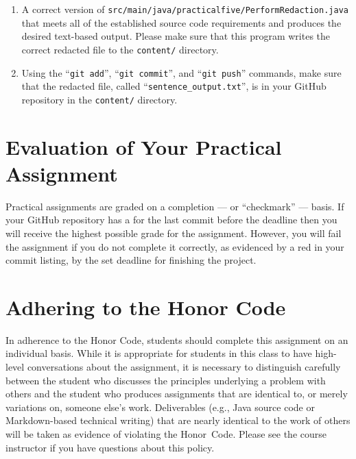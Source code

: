 \documentclass[11pt]{article}
\newcommand{\mainprogramsource}{\lstinline{src/main/java/practicalfive/PerformRedaction.java}}
\newcommand{\command}[1]{``\lstinline{#1}''}
\newcommand{\program}[1]{\lstinline{#1}}
\newcommand{\checkmark}{\ding{51}}
\newcommand{\naughtmark}{\ding{55}}
\begin{document}
\begin{enumerate}

\setlength{\itemsep}{0in}

\item A correct version of \mainprogramsource{} that meets all of the
  established source code requirements and produces the desired text-based
  output. Please make sure that this program writes the correct redacted file to
  the \program{content/} directory.

\item Using the \command{git add}, \command{git commit}, and \command{git push}
  commands, make sure that the redacted file, called
  \command{sentence_output.txt}, is in your GitHub repository in the
  \program{content/} directory.

\end{enumerate}

\section*{Evaluation of Your Practical Assignment}

Practical assignments are graded on a completion --- or ``checkmark'' --- basis.
If your GitHub repository has a \checkmark{} for the last commit before the
deadline then you will receive the highest possible grade for the assignment.
However, you will fail the assignment if you do not complete it correctly, as
evidenced by a red \naughtmark{} in your commit listing, by the set deadline for
finishing the project.

\section*{Adhering to the Honor Code}

In adherence to the Honor Code, students should complete this assignment on an
individual basis. While it is appropriate for students in this class to have
high-level conversations about the assignment, it is necessary to distinguish
carefully between the student who discusses the principles underlying a problem
with others and the student who produces assignments that are identical to, or
merely variations on, someone else's work. Deliverables (e.g., Java source code
or Markdown-based technical writing) that are nearly identical to the work of
others will be taken as evidence of violating the \mbox{Honor Code}. Please see
the course instructor if you have questions about this policy.
\end{document}
